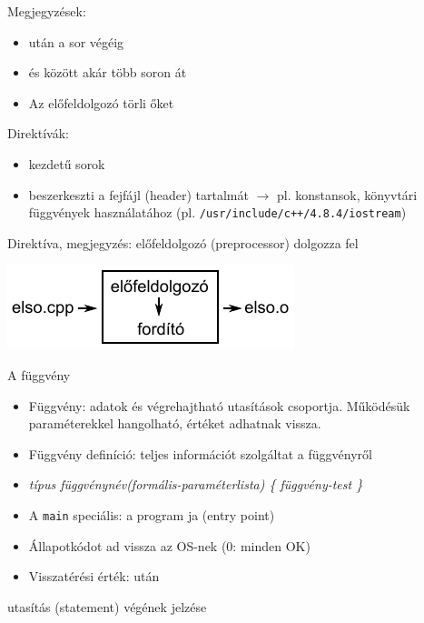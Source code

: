 \documentclass[usenames,dvipsnames,aspectratio=169]{beamer}
\begin{document}
\begin{frame}
  Megjegyzések:
  \begin{itemize}
    \item \kiemel{//} után a sor végéig
    \item \kiemel{/*} és \kiemel{*/} között akár több soron át
    \item Az előfeldolgozó törli őket
  \end{itemize}
  Direktívák:
  \begin{itemize}
    \item \kiemel{\#} kezdetű sorok
    \item {} beszerkeszti a fejfájl (header) tartalmát $\rightarrow$ pl. konstansok, könyvtári 
függvények használatához (pl. \texttt{/usr/include/c++/4.8.4/iostream})
  \end{itemize}
  Direktíva, megjegyzés: előfeldolgozó (preprocessor) dolgozza fel
  \begin{center}
    \includegraphics{elofeld.pdf}
  \end{center}
\end{frame}

\begin{frame}
  A \texttt{} függvény
  \begin{itemize}
    \item Függvény: adatok és végrehajtható utasítások csoportja. Működésük paraméterekkel hangolható, értéket adhatnak vissza.
    \item Függvény definíció: teljes információt szolgáltat a függvényről
    \item \emph{típus függvénynév(formális-paraméterlista) \{ függvény-test \}}
    \item A \texttt{main} speciális: a program ja (entry point)
    \item Állapotkódot ad vissza az OS-nek (0: minden OK)
    \item Visszatérési érték: \texttt{} után
  \end{itemize}
  \kiemel{;} utasítás (statement) végének jelzése
\end{frame}
\end{document}
